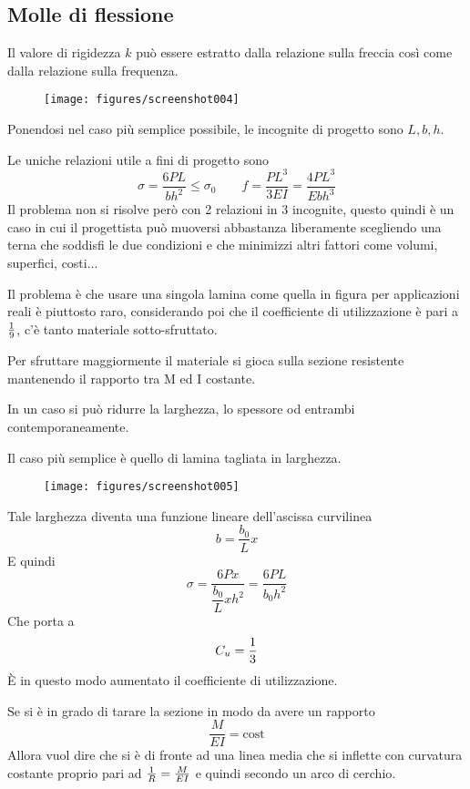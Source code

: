 \documentclass[a4paper, 15pt]{article}
\begin{document}
\subsection{Molle di flessione}
\begin{adjustwidth}{2in}{}	
Il valore di rigidezza $k$ può essere estratto dalla relazione sulla freccia così come dalla relazione sulla frequenza. 		
\begin{figure}[H]
	\centering
	\texttt{[image: figures/screenshot004]}
	\label{fig:screenshot004}
\end{figure}	
Ponendosi nel caso più semplice possibile, le incognite di progetto sono $L, b, h$. 

Le uniche relazioni utile a fini di progetto sono
\[\sigma = \dfrac{6PL}{bh^2}\leq\sigma_0 \qquad f = \dfrac{PL^3}{3EI} = \dfrac{4PL^3}{Ebh^3}\]
Il problema non si risolve però con 2 relazioni in 3 incognite, questo quindi è un caso in cui il progettista può muoversi abbastanza liberamente scegliendo una terna che soddisfi le due condizioni e che minimizzi altri fattori come volumi, superfici, costi...\newline 

Il problema è che usare una singola lamina come quella in figura per applicazioni reali è piuttosto raro, considerando poi che il coefficiente di utilizzazione è pari a $1\over9$, c'è tanto materiale sotto-sfruttato. \newline 

Per sfruttare maggiormente il materiale si gioca sulla sezione resistente mantenendo il rapporto tra M ed I costante.

In un caso si può ridurre la larghezza, lo spessore od entrambi contemporaneamente.  \newline 

Il caso più semplice è quello di lamina tagliata in larghezza.
\begin{figure}[H]
	\centering
	\texttt{[image: figures/screenshot005]}
	\label{fig:screenshot005}
\end{figure}
Tale larghezza diventa una funzione lineare dell'ascissa curvilinea 
\[b = \dfrac{b_0}{L}x\]
E quindi 
\[\sigma = \dfrac{6Px}{\dfrac{b_0}{L}xh^2} = \dfrac{6PL}{b_0h^2}\]
Che porta a 
\[C_u = {1\over3}\]
È in questo modo aumentato il coefficiente di utilizzazione. 

Se si è in grado di tarare la sezione in modo da avere un rapporto 
\[\dfrac{M}{EI} = \text{cost}\]
Allora vuol dire che si è di fronte ad una linea media che si inflette con curvatura costante proprio pari ad ${1\over R} = {M\over EI}$ e quindi secondo un arco di cerchio. 


\end{adjustwidth}
\end{document}
